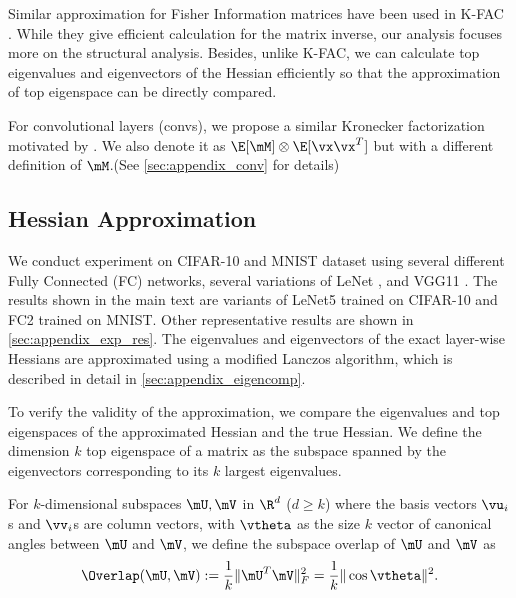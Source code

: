 Similar approximation for Fisher Information matrices have been used in K-FAC \citep{martens2015optimizing}. While they give efficient calculation for the matrix inverse, our analysis focuses more on the structural analysis. Besides, unlike K-FAC, we can calculate top eigenvalues and eigenvectors of the Hessian efficiently \citep{yao2019pyhessian} so that the approximation of top eigenspace can be directly compared. 

For convolutional layers (convs), we propose a similar Kronecker factorization motivated by \citet{grosse2016kronecker}. We also denote it as $\E[\mM]\otimes \E[\vx\vx^T]$ but with a different definition of $\mM$.(See \cref{sec:appendix_conv} for details) 
\subsection{Hessian Approximation}
We conduct experiment on CIFAR-10 \citep{Krizhevsky09learningmultiple} and MNIST \citep{lecun1998gradient} dataset using several different Fully Connected (FC) networks, several variations of LeNet \citep{lecun1998gradient}, and VGG11 \citep{simonyan2014very}. The results shown in the main text are variants of LeNet5 trained on CIFAR-10 and FC2 trained on MNIST. Other representative results are shown in \cref{sec:appendix_exp_res}. The eigenvalues and eigenvectors of the exact layer-wise Hessians are approximated using a modified Lanczos algorithm, which is described in detail in \cref{sec:appendix_eigencomp}.

To verify the validity of the approximation, we compare the eigenvalues and top eigenspaces of the approximated Hessian and the true Hessian.
We define the dimension $k$ top eigenspace of a matrix as the subspace spanned by the eigenvectors corresponding to its $k$ largest eigenvalues.

\theoremstyle{definition}
\begin{definition}
For $k$-dimensional subspaces $\mU,\mV$ in $\R^d$ ($d\geq k$) where the basis vectors $\vu_i$s and $\vv_i$s are column vectors, with $\vtheta$ as the size $k$ vector of canonical angles between $\mU$ and $\mV$, we define the subspace overlap of $\mU$ and $\mV$ as
\begin{equation}
    \Overlap(\mU, \mV) := \frac{1}{k}\|\mU^T\mV\|^2_F =\frac{1}{k}\|\cos\vtheta\|^2.
    \label{eqn:overlap}
\end{equation}
\end{definition}

